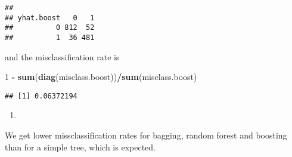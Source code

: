 \documentclass[]{article}
\newenvironment{Shaded}{\begin{snugshade}}{\end{snugshade}}
\newcommand{\DecValTok}[1]{\textcolor[rgb]{0.00,0.00,0.81}{#1}}
\newcommand{\KeywordTok}[1]{\textcolor[rgb]{0.13,0.29,0.53}{\textbf{#1}}}
\newcommand{\NormalTok}[1]{#1}
\newcommand{\OperatorTok}[1]{\textcolor[rgb]{0.81,0.36,0.00}{\textbf{#1}}}
\newcommand{\StringTok}[1]{\textcolor[rgb]{0.31,0.60,0.02}{#1}}
\begin{document}
\begin{verbatim}
##           
## yhat.boost   0   1
##          0 812  52
##          1  36 481
\end{verbatim}

and the misclassification rate is

\begin{Shaded}
\begin{Highlighting}[]
\DecValTok{1} \OperatorTok{-}\StringTok{ }\KeywordTok{sum}\NormalTok{(}\KeywordTok{diag}\NormalTok{(misclass.boost))}\OperatorTok{/}\KeywordTok{sum}\NormalTok{(misclass.boost)}
\end{Highlighting}
\end{Shaded}

\begin{verbatim}
## [1] 0.06372194
\end{verbatim}

\begin{enumerate}
\def\labelenumi{\roman{enumi})}
\item
\end{enumerate}

We get lower missclassification rates for bagging, random forest and
boosting than for a simple tree, which is expected.
\end{document}

